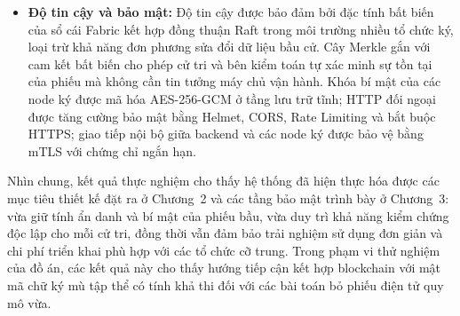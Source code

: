 \begin{itemize}
    \item \textbf{Độ tin cậy và bảo mật:} Độ tin cậy được bảo đảm bởi đặc tính bất biến của sổ cái Fabric kết hợp đồng thuận Raft trong môi trường nhiều tổ chức ký, loại trừ khả năng đơn phương sửa đổi dữ liệu bầu cử. Cây Merkle gắn với cam kết bất biến cho phép cử tri và bên kiểm toán tự xác minh sự tồn tại của phiếu mà không cần tin tưởng máy chủ vận hành. Khóa bí mật của các node ký được mã hóa AES-256-GCM ở tầng lưu trữ tĩnh; HTTP đối ngoại được tăng cường bảo mật bằng Helmet, CORS, Rate Limiting và bắt buộc HTTPS; giao tiếp nội bộ giữa backend và các node ký được bảo vệ bằng mTLS với chứng chỉ ngắn hạn.
\end{itemize}

Nhìn chung, kết quả thực nghiệm cho thấy hệ thống đã hiện thực hóa được các mục tiêu thiết kế đặt ra ở Chương~2 và các tầng bảo mật trình bày ở Chương~3: vừa giữ tính ẩn danh và bí mật của phiếu bầu, vừa duy trì khả năng kiểm chứng độc lập cho mỗi cử tri, đồng thời vẫn đảm bảo trải nghiệm sử dụng đơn giản và chi phí triển khai phù hợp với các tổ chức cỡ trung. Trong phạm vi thử nghiệm của đồ án, các kết quả này cho thấy hướng tiếp cận kết hợp blockchain với mật mã chữ ký mù tập thể có tính khả thi đối với các bài toán bỏ phiếu điện tử quy mô vừa.
